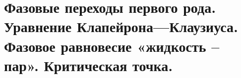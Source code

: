 \section{\normalsize Фазовые переходы первого рода. Уравнение Клапейрона—Клаузиуса. Фазовое равновесие «жидкость -- пар». Критическая точка.}
